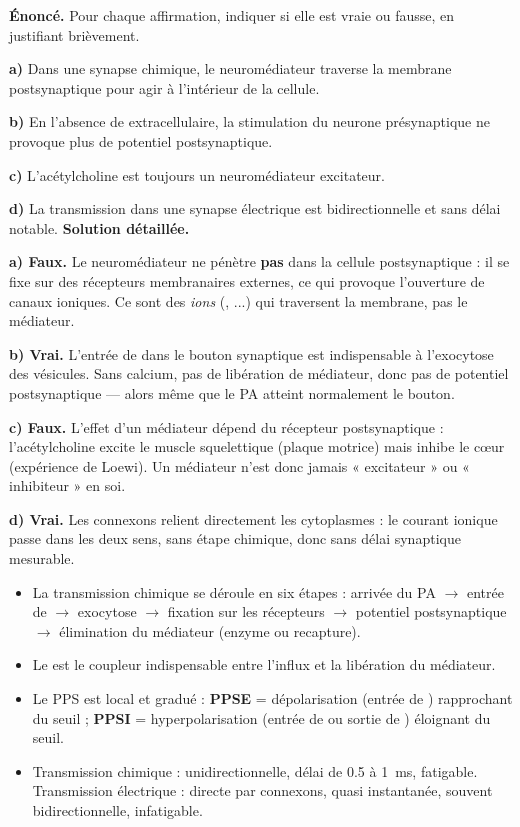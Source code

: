 \documentclass[11pt]{article}
\begin{document}
\begin{exoresolu}
\textbf{Énoncé.} Pour chaque affirmation, indiquer si elle est vraie ou fausse, en justifiant brièvement.

\textbf{a)} Dans une synapse chimique, le neuromédiateur traverse la membrane postsynaptique pour agir à l'intérieur de la cellule.

\textbf{b)} En l'absence de  extracellulaire, la stimulation du neurone présynaptique ne provoque plus de potentiel postsynaptique.

\textbf{c)} L'acétylcholine est toujours un neuromédiateur excitateur.

\textbf{d)} La transmission dans une synapse électrique est bidirectionnelle et sans délai notable.
\tcblower
\textbf{Solution détaillée.}

\textbf{a) Faux.} Le neuromédiateur ne pénètre \textbf{pas} dans la cellule postsynaptique : il se fixe sur des récepteurs membranaires externes, ce qui provoque l'ouverture de canaux ioniques. Ce sont des \emph{ions} (, ...) qui traversent la membrane, pas le médiateur.

\textbf{b) Vrai.} L'entrée de  dans le bouton synaptique est indispensable à l'exocytose des vésicules. Sans calcium, pas de libération de médiateur, donc pas de potentiel postsynaptique — alors même que le PA atteint normalement le bouton.

\textbf{c) Faux.} L'effet d'un médiateur dépend du récepteur postsynaptique : l'acétylcholine excite le muscle squelettique (plaque motrice) mais inhibe le cœur (expérience de Loewi). Un médiateur n'est donc jamais « excitateur » ou « inhibiteur » en soi.

\textbf{d) Vrai.} Les connexons relient directement les cytoplasmes : le courant ionique passe dans les deux sens, sans étape chimique, donc sans délai synaptique mesurable.
\end{exoresolu}

\begin{aretenir}
\begin{itemize}
\item La transmission chimique se déroule en six étapes : arrivée du PA $\rightarrow$ entrée de  $\rightarrow$ exocytose $\rightarrow$ fixation sur les récepteurs $\rightarrow$ potentiel postsynaptique $\rightarrow$ élimination du médiateur (enzyme ou recapture).
\item Le  est le coupleur indispensable entre l'influx et la libération du médiateur.
\item Le PPS est local et gradué : \textbf{PPSE} = dépolarisation (entrée de ) rapprochant du seuil ; \textbf{PPSI} = hyperpolarisation (entrée de  ou sortie de ) éloignant du seuil.
\item Transmission chimique : unidirectionnelle, délai de \num{0,5} à \SI{1}{ms}, fatigable. Transmission électrique : directe par connexons, quasi instantanée, souvent bidirectionnelle, infatigable.
\end{itemize}
\end{aretenir}
\end{document}
